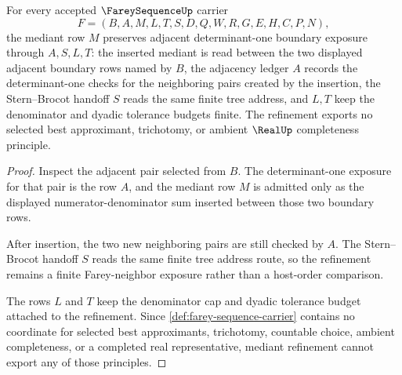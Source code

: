 \begin{theorem}
\label{thm:farey-sequence-mediant-refinement-stability}
For every accepted $\FareySequenceUp$ carrier
$$
F=(B,A,M,L,T,S,D,Q,W,R,G,E,H,C,P,N),
$$
the mediant row $M$ preserves adjacent determinant-one boundary exposure through $A,S,L,T$: the inserted mediant is read between the two displayed adjacent boundary rows named by $B$, the adjacency ledger $A$ records the determinant-one checks for the neighboring pairs created by the insertion, the Stern--Brocot handoff $S$ reads the same finite tree address, and $L,T$ keep the denominator and dyadic tolerance budgets finite. The refinement exports no selected best approximant, trichotomy, or ambient $\RealUp$ completeness principle.
\end{theorem}
\begin{proof}
Inspect the adjacent pair selected from $B$. The determinant-one exposure for that pair is the row $A$, and the mediant row $M$ is admitted only as the displayed numerator-denominator sum inserted between those two boundary rows.

After insertion, the two new neighboring pairs are still checked by $A$. The Stern--Brocot handoff $S$ reads the same finite tree address route, so the refinement remains a finite Farey-neighbor exposure rather than a host-order comparison.

The rows $L$ and $T$ keep the denominator cap and dyadic tolerance budget attached to the refinement. Since \autoref{def:farey-sequence-carrier} contains no coordinate for selected best approximants, trichotomy, countable choice, ambient completeness, or a completed real representative, mediant refinement cannot export any of those principles.
\end{proof}





